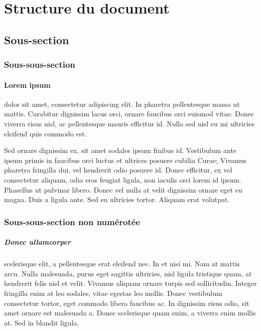 \documentclass[a4paper, 11pt]{article}
\begin{document}
\setcounter{tocdepth}{1}%
\tableofcontents

\clearpage

  \section{Structure du document} \label{structure}

    \subsection{Sous-section}

      \subsubsection{Sous-sous-section}

        \paragraph{Lorem ipsum} dolor sit amet, consectetur adipiscing elit. In pharetra pellentesque massa ut mattis. Curabitur dignissim lacus orci, ornare faucibus orci euismod vitae. Donec viverra risus nisl, ac pellentesque mauris efficitur id. Nulla sed nisl eu mi ultricies eleifend quis commodo est.

        Sed ornare dignissim ex, sit amet sodales ipsum finibus id. Vestibulum ante ipsum primis in faucibus orci luctus et ultrices posuere cubilia Curae; Vivamus pharetra fringilla dui, vel hendrerit odio posuere id. Donec efficitur, ex vel consectetur aliquam, odio eros feugiat ligula, non iaculis orci lorem id ipsum. Phasellus ut pulvinar libero. Donec vel nulla at velit dignissim ornare eget eu magna. Duis a ligula ante. Sed eu ultricies tortor. Aliquam erat volutpat.

      \subsubsection*{Sous-sous-section non numérotée}

        \subparagraph{Donec ullamcorper} scelerisque elit, a pellentesque erat eleifend nec. In et nisi mi. Nam at mattis arcu. Nulla malesuada, purus eget sagittis ultricies, nisl ligula tristique quam, at hendrerit felis nisl et velit. Vivamus aliquam ornare turpis sed sollicitudin. Integer fringilla enim at leo sodales, vitae egestas leo mollis. Donec vestibulum consectetur tortor, eget commodo libero faucibus ac. In dignissim risus odio, sit amet ornare est malesuada a. Donec scelerisque quam enim, a viverra enim mollis at. Sed in blandit ligula. 
\end{document}
